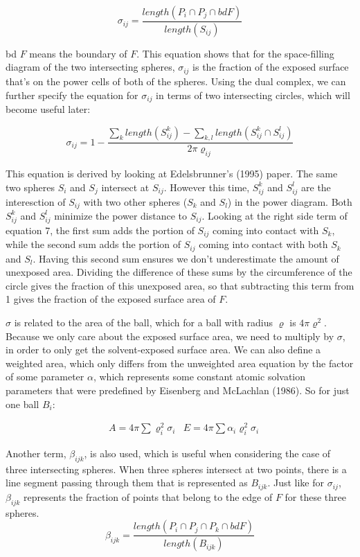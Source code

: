 \documentclass{article}
\begin{document}
\begin{equation}
\sigma_{ij} = \frac{length(P_i \cap P_j \cap bd F)}{length(S_{ij})}
\end{equation}

bd $F$ means the boundary of $F$. This equation shows that for the space-filling diagram of the two intersecting spheres, $\sigma_{ij}$ is the fraction of the exposed surface that's on the power cells of both of the spheres.
Using the dual complex, we can further specify the equation for $\sigma_{ij}$ in terms of two intersecting circles, which will become useful later:

\begin{equation}
\sigma_{ij} = 1 - \frac{\sum_{k}length(S^k_{ij})- \sum_{k,l}length(S^k_{ij} \cap S^l_{ij})}{2\pi\varrho_{ij}}
\end{equation}

This equation is derived by looking at Edelsbrunner's (1995) paper. The same two spheres $S_i$ and $S_j$ intersect at $S_{ij}$. However this time, $S^k_{ij}$ and $S^l_{ij}$ are the interesction of $S_{ij}$ with two other spheres ($S_k$ and $S_l$) in the power diagram. Both  $S^k_{ij}$ and $S^l_{ij}$ minimize the power distance to $S_{ij}$. Looking at the right side term of equation 7, the first sum adds the portion of $S_{ij}$ coming into contact with $S_k$, while the second sum adds the portion of $S_{ij}$ coming into contact with both $S_k$ and $S_l$. Having this second sum ensures we don't underestimate the amount of unexposed area. Dividing the difference of these sums by the circumference of the circle gives the fraction of this unexposed area, so that subtracting this term from 1 gives the fraction of the exposed surface area of $F$.

$\sigma$ is related to the area of the ball, which for a ball with radius $\varrho$ is $4\pi\varrho^2$. Because we only care about the exposed surface area, we need to multiply by $\sigma$, in order to only get the solvent-exposed surface area. We can also define a weighted area, which only differs from the unweighted area equation by the factor of some parameter $\alpha$, which represents some constant atomic solvation parameters that were predefined by Eisenberg and McLachlan (1986). So for just one ball $B_i$:

\begin{align*}
&A = 4\pi\sum \varrho_i^2\sigma_i
&E = 4\pi\sum\alpha_i\varrho_i^2\sigma_i
\end{align*}


Another term, $\beta_{ijk}$, is also used, which is useful when considering the case of three intersecting spheres. When three spheres intersect at two points, there is a line segment passing through them that is represented as $B_{ijk}$. Just like for $\sigma_{ij}$, $\beta_{ijk}$ represents the fraction of points that belong to the edge of $F$ for these three spheres.
\begin{equation}
\beta_{ijk} = \frac{length(P_i \cap P_j \cap P_k \cap bd F)}{length(B_{ijk})}
\end{equation}
\end{document}
